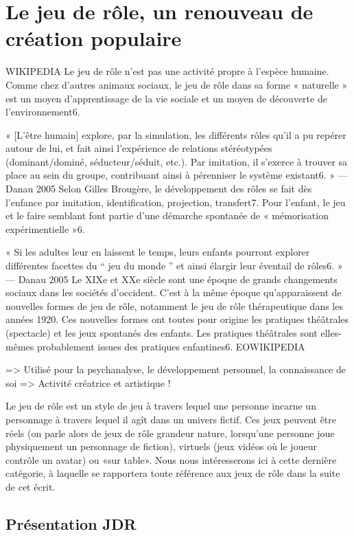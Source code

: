 \section{Le jeu de rôle, un renouveau de création populaire}

WIKIPEDIA
Le jeu de rôle n'est pas une activité propre à l'espèce humaine. Comme chez d'autres animaux sociaux, le jeu de rôle dans sa forme « naturelle » est un moyen d'apprentissage de la vie sociale et un moyen de découverte de l'environnement6.

« [L'être humain] explore, par la simulation, les différents rôles qu’il a pu repérer autour de lui, et fait ainsi l’expérience de relations stéréotypées (dominant/dominé, séducteur/séduit, etc.). Par imitation, il s’exerce à trouver sa place au sein du groupe, contribuant ainsi à pérenniser le système existant6. » — Danau 2005
Selon Gilles Brougère, le développement des rôles se fait dès l’enfance par imitation, identification, projection, transfert7. Pour l'enfant, le jeu et le faire semblant font partie d'une démarche spontanée de « mémorisation expérimentielle »6.

« Si les adultes leur en laissent le temps, leurs enfants pourront explorer différentes facettes du “ jeu du monde ” et ainsi élargir leur éventail de rôles6. » — Danau 2005
Le XIXe et XXe siècle sont une époque de grands changements sociaux dans les sociétés d'occident. C'est à la même époque qu'apparaissent de nouvelles formes de jeu de rôle, notamment le jeu de rôle thérapeutique dans les années 1920. Ces nouvelles formes ont toutes pour origine les pratiques théâtrales (spectacle) et les jeux spontanés des enfants. Les pratiques théâtrales sont elles-mêmes probablement issues des pratiques enfantines6.
EOWIKIPEDIA

=> Utilisé pour la psychanalyse, le développement personnel, la connaissance de soi
=> Activité créatrice et artistique !


Le jeu de rôle est un style de jeu à travers lequel une personne incarne un personnage à travers lequel il agît dans un univers fictif. Ces jeux peuvent être réels (on parle alors de jeux de rôle grandeur nature, lorsqu'une personne joue physiquement un personnage de fiction), virtuels (jeux vidéos où le joueur contrôle un avatar) ou «sur table». Nous nous intéresserons ici à cette dernière catégorie, à laquelle se rapportera toute référence aux jeux de rôle dans la suite de cet écrit.

\subsection{Présentation JDR}

